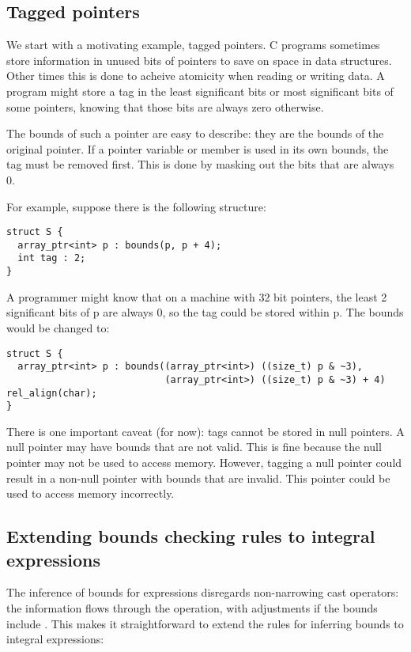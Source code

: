 \subsection{Tagged pointers}
We start with a motivating example, tagged pointers.
C programs sometimes store information in unused bits of pointers
to save on space in data structures.  Other times this is done
to acheive atomicity when reading or writing data.  A
program might store a tag in the least significant bits or most
significant bits of some pointers, knowing that those bits are always
zero otherwise.

The bounds of such a pointer are easy to describe: they are the bounds
of the original pointer. If a pointer variable or member is used in its
own bounds, the tag must be removed first. This is
done by masking out the bits that are always 0.

For example, suppose there is the following structure:

\begin{lstlisting}
struct S {
  array_ptr<int> p : bounds(p, p + 4);
  int tag : 2;
}
\end{lstlisting}

A programmer might know that on a machine with 32 bit pointers, the
least 2 significant bits of p are always 0, so the tag could be stored
within p. The bounds would be changed to:

\begin{lstlisting}
struct S {
  array_ptr<int> p : bounds((array_ptr<int>) ((size_t) p & ~3), 
                            (array_ptr<int>) ((size_t) p & ~3) + 4) rel_align(char);
}
\end{lstlisting}

There is one important caveat (for now): tags cannot be stored in null pointers. A
null pointer may have bounds that are not valid. This is fine because
the null pointer may not be used to access memory. However, tagging a
null pointer could result in a non-null pointer with bounds that are
invalid. This pointer could be used to access memory incorrectly.

\subsection{Extending bounds checking rules to integral
expressions}

The inference of bounds for expressions disregards non-narrowing cast operators:
the  information flows through the operation, with adjustments if the bounds
include \exprcurrentvalue.  This makes it straightforward to extend the
rules for inferring bounds to integral expressions:

